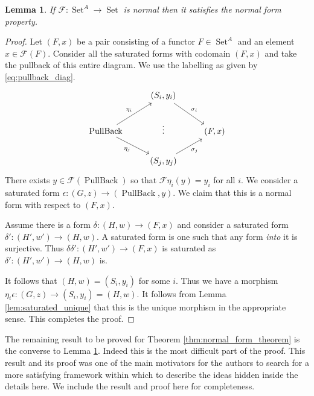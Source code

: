 \documentclass[12pt]{article}
\theoremstyle{plain}
\newtheorem{lemma}[thm]{Lemma}
\theoremstyle{definition}
\newcommand{\scr}[1]{\mathscr{#1}}
\newcommand{\lto}{\longrightarrow}
\DeclareMathOperator{\set}{Set}
\begin{document}
	\begin{lemma}\label{lem:normal--->finite_normal_form_property}
		If $\scr{F}: \set^A \lto \set$ is normal then it satisfies the normal form property.
		\end{lemma}
	\begin{proof}
		Let $(F,x)$ be a pair consisting of a functor $F \in \set^A$ and an element $x \in \scr{F}(F)$. Consider all the saturated forms with codomain $(F,x)$ and take the pullback of this entire diagram. We use the labelling as given by \eqref{eq:pullback_diag}.
		\begin{equation}\label{eq:pullback_diag}
			\begin{tikzcd}
				& (S_i, y_i)\arrow[dr,"{\sigma_i}"]\\
				\operatorname{PullBack}\arrow[ur,"{\eta_i}"]\arrow[dr,swap,"{\eta_j}"] & \vdots & (F,x)\\
				 & (S_j, y_j)\arrow[ur,swap,"{\sigma_j}"]
				\end{tikzcd}
			\end{equation}
		There exists $y \in \scr{F}(\operatorname{PullBack})$ so that $\scr{F}\eta_i(y) = y_i$ for all $i$. We consider a saturated form $\epsilon: (G, z) \lto (\operatorname{PullBack}, y)$. We claim that this is a normal form with respect to $(F,x)$.
		
		Assume there is a form $\delta: (H, w) \lto (F,x)$ and consider a saturated form $\delta': (H', w') \lto (H, w)$. A saturated form is one such that any form \emph{into} it is surjective. Thus $\delta \delta': (H', w')\lto (F,x)$ is saturated as $\delta': (H', w') \lto (H,w)$ is.
		
		It follows that $(H,w) = (S_i, y_i)$ for some $i$. Thus we have a morphism $\eta_i \epsilon: (G, z) \lto (S_i, y_i) = (H,w)$. It follows from Lemma \ref{lem:saturated_unique} that this is the unique morphism in the appropriate sense. This completes the proof.
		\end{proof}

The remaining result to be proved for Theorem \ref{thm:normal_form_theorem} is the converse to Lemma \ref{lem:normal--->finite_normal_form_property}. Indeed this is the most difficult part of the proof. This result and its proof was one of the main motivators for the authors to search for a more satisfying framework within which to describe the ideas hidden inside the details here. We include the result and proof here for completeness.
 
\end{document}
